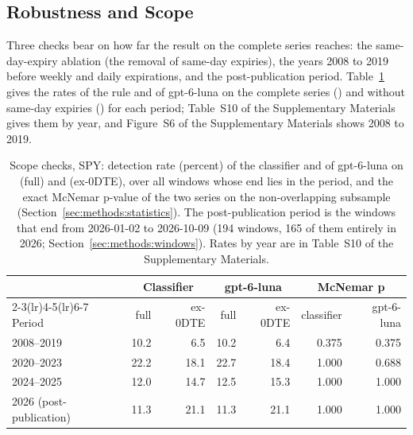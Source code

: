 \subsection{Robustness and Scope}
\label{sec:results:scope}

Three checks bear on how far the result on the complete series reaches: the same-day-expiry ablation (the removal of same-day expiries), the years 2008 to 2019 before weekly and daily expirations, and the post-publication period. Table~\ref{tab:scope} gives the rates of the rule and of gpt-6-luna on the complete series () and without same-day expiries () for each period; Table~S10 of the Supplementary Materials gives them by year, and Figure~S6 of the Supplementary Materials shows 2008 to 2019.

\begin{table}[!htbp]
\centering
\caption{Scope checks, SPY: detection rate (percent) of the classifier and of gpt-6-luna on  (full) and  (ex-0DTE), over all windows whose end lies in the period, and the exact McNemar p-value of the two series on the non-overlapping subsample (Section~\ref{sec:methods:statistics}). The post-publication period is the windows that end from 2026-01-02 to 2026-10-09 (194 windows, 165 of them entirely in 2026; Section~\ref{sec:methods:windows}). Rates by year are in Table~S10 of the Supplementary Materials.}
\label{tab:scope}
\footnotesize
\begin{tabular}{@{}lrrrrrr@{}}
\toprule
 & \multicolumn{2}{c}{Classifier} & \multicolumn{2}{c}{gpt-6-luna} & \multicolumn{2}{c}{McNemar p} \\
\cmidrule(lr){2-3}\cmidrule(lr){4-5}\cmidrule(lr){6-7}
Period & full & ex-0DTE & full & ex-0DTE & classifier & gpt-6-luna \\
\midrule
2008--2019 & 10.2 & 6.5 & 10.2 & 6.4 & 0.375 & 0.375 \\
2020--2023 & 22.2 & 18.1 & 22.7 & 18.4 & 1.000 & 0.688 \\
2024--2025 & 12.0 & 14.7 & 12.5 & 15.3 & 1.000 & 1.000 \\
2026 (post-publication) & 11.3 & 21.1 & 11.3 & 21.1 & 1.000 & 1.000 \\
\bottomrule
\end{tabular}
\end{table}


